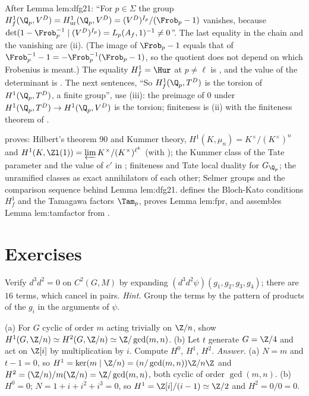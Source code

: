 \begin{paperlink}\label{pl:cohomology:unramified}
After Lemma lem:dfg21: ``For $p\in\Sigma$ the group $H^1_f(\Q_p,V^D)=H^1_{\mathrm{ur}}(\Q_p,V^D)=(V^D)^{I_p}/(\Frob_p-1)$ vanishes, because
$\det(1-\Frob_p^{-1}\mid(V^D)^{I_p})=L_p(A_f,1)^{-1}\ne0$''. The last equality in the chain and the vanishing are (ii). (The image of $\Frob_p-1$ equals that of
$\Frob_p^{-1}-1=-\Frob_p^{-1}(\Frob_p-1)$, so the quotient does not depend on which Frobenius is meant.) The equality
$H^1_f=\Hur$ at $p\ne\ell$ is , and the value of the determinant is . The next sentences, ``So $H^1_f(\Q_p,T^D)$ is the torsion of
$H^1(\Q_p,T^D)$, a finite group'', use (iii): the preimage of $0$ under $H^1(\Q_p,T^D)\to H^1(\Q_p,V^D)$ is the torsion; finiteness is
(ii) with the finiteness theorem of .
\end{paperlink}

\begin{remark}\label{rem:cohomology:road}
 proves: Hilbert's theorem 90 and Kummer theory, $H^1(K,\mu_n)=K^\times/(K^\times)^n$ and $H^1(K,\Zl(1))=\varprojlim K^\times/(K^\times)^{\ell^k}$ (with
); the Kummer class of the Tate parameter and the value of $c'$ in ; finiteness and Tate local duality for
$G_{\Q_p}$; the unramified classes as exact annihilators of each other; Selmer groups and the comparison sequence behind Lemma lem:dfg21. 
defines the Bloch-Kato conditions $H^1_f$ and the Tamagawa factors $\Tam_p$, proves Lemma lem:fpr, and assembles Lemma lem:tamfactor from .
\end{remark}

\section{Exercises}\label{sec:cohomology:exercises}

\begin{exercise}\label{ex:cohomology:dd3}
Verify $d^3d^2=0$ on $C^2(G,M)$ by expanding $(d^3d^2\psi)(g_1,g_2,g_3,g_4)$; there are $16$ terms, which cancel in pairs.
\emph{Hint.} Group the terms by the pattern of products of the $g_i$ in the arguments of $\psi$.
\end{exercise}

\begin{exercise}\label{ex:cohomology:cyclic-ex}
(a) For $G$ cyclic of order $m$ acting trivially on $\Z/n$, show $H^1(G,\Z/n)\simeq H^2(G,\Z/n)\simeq\Z/\gcd(m,n)$. (b) Let $t$ generate $G=\Z/4$ and act on $\Z[i]$ by multiplication by $i$.
Compute $H^0$, $H^1$, $H^2$.
\emph{Answer.} (a) $N=m$ and $t-1=0$, so $H^1=\ker(m\mid\Z/n)=(n/\gcd(m,n))\Z/n\Z$ and $H^2=(\Z/n)/m(\Z/n)=\Z/\gcd(m,n)$, both cyclic of order $\gcd(m,n)$. (b) $H^0=0$; $N=1+i+i^2+i^3=0$, so $H^1=\Z[i]/(i-1)\simeq\Z/2$ and $H^2=0/0=0$.
\end{exercise}

